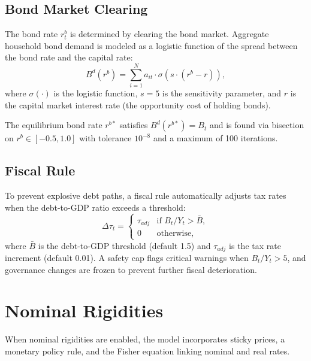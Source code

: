 \documentclass[12pt]{article}
\begin{document}
\subsection{Bond Market Clearing}\label{sec:bond_clearing}

The bond rate $r^b_t$ is determined by clearing the bond market. Aggregate household bond demand is modeled as a logistic function of the spread between the bond rate and the capital rate:
\begin{equation}\label{eq:bond_demand}
  B^d(r^b) = \sum_{i=1}^{N} a_{it} \cdot \sigma(s \cdot (r^b - r)),
\end{equation}
where $\sigma(\cdot)$ is the logistic function, $s = 5$ is the sensitivity parameter, and $r$ is the capital market interest rate (the opportunity cost of holding bonds).

The equilibrium bond rate $r^{b*}$ satisfies $B^d(r^{b*}) = B_t$ and is found via bisection on $r^b \in [-0.5, 1.0]$ with tolerance $10^{-8}$ and a maximum of 100 iterations.

\subsection{Fiscal Rule}\label{sec:fiscal_rule}

To prevent explosive debt paths, a fiscal rule automatically adjusts tax rates when the debt-to-GDP ratio exceeds a threshold:
\begin{equation}\label{eq:fiscal_rule}
  \Delta \tau_t =
  \begin{cases}
    \tau_{adj} & \text{if } B_t / Y_t > \bar{B}, \\
    0 & \text{otherwise},
  \end{cases}
\end{equation}
where $\bar{B}$ is the debt-to-GDP threshold (default 1.5) and $\tau_{adj}$ is the tax rate increment (default 0.01). A safety cap flags critical warnings when $B_t / Y_t > 5$, and governance changes are frozen to prevent further fiscal deterioration.


\section{Nominal Rigidities}\label{sec:nominal}

When nominal rigidities are enabled, the model incorporates sticky prices, a monetary policy rule, and the Fisher equation linking nominal and real rates.
\end{document}
